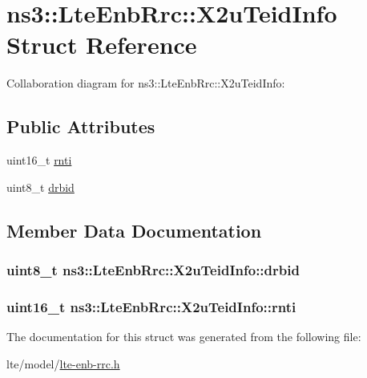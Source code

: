 \hypertarget{structns3_1_1LteEnbRrc_1_1X2uTeidInfo}{}\section{ns3\+:\+:Lte\+Enb\+Rrc\+:\+:X2u\+Teid\+Info Struct Reference}
\label{structns3_1_1LteEnbRrc_1_1X2uTeidInfo}


Collaboration diagram for ns3\+:\+:Lte\+Enb\+Rrc\+:\+:X2u\+Teid\+Info\+:
\subsection*{Public Attributes}
\begin{DoxyCompactItemize}
\item 
uint16\+\_\+t \hyperlink{structns3_1_1LteEnbRrc_1_1X2uTeidInfo_aad93ae490ebe7842ebf7dc9deb38dcb0}{rnti}
\item 
uint8\+\_\+t \hyperlink{structns3_1_1LteEnbRrc_1_1X2uTeidInfo_a6cb5856e93cdade7e2db12c3bde3f72b}{drbid}
\end{DoxyCompactItemize}


\subsection{Member Data Documentation}
\subsubsection[{\texorpdfstring{drbid}{drbid}}]{\setlength{\rightskip}{0pt plus 5cm}uint8\+\_\+t ns3\+::\+Lte\+Enb\+Rrc\+::\+X2u\+Teid\+Info\+::drbid}\hypertarget{structns3_1_1LteEnbRrc_1_1X2uTeidInfo_a6cb5856e93cdade7e2db12c3bde3f72b}{}\label{structns3_1_1LteEnbRrc_1_1X2uTeidInfo_a6cb5856e93cdade7e2db12c3bde3f72b}
\subsubsection[{\texorpdfstring{rnti}{rnti}}]{\setlength{\rightskip}{0pt plus 5cm}uint16\+\_\+t ns3\+::\+Lte\+Enb\+Rrc\+::\+X2u\+Teid\+Info\+::rnti}\hypertarget{structns3_1_1LteEnbRrc_1_1X2uTeidInfo_aad93ae490ebe7842ebf7dc9deb38dcb0}{}\label{structns3_1_1LteEnbRrc_1_1X2uTeidInfo_aad93ae490ebe7842ebf7dc9deb38dcb0}


The documentation for this struct was generated from the following file\+:\begin{DoxyCompactItemize}
\item 
lte/model/\hyperlink{lte-enb-rrc_8h}{lte-\/enb-\/rrc.\+h}\end{DoxyCompactItemize}
